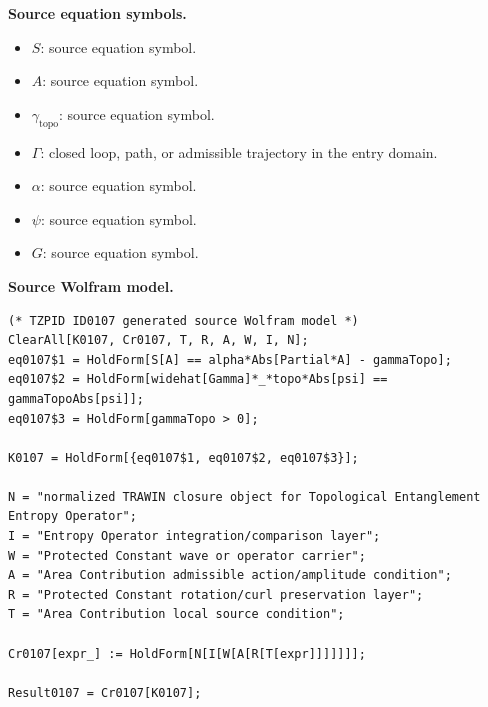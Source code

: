 \begin{minipage}[t]{0.49\linewidth}
\begingroup
\small
\raggedright
\textbf{Source equation symbols.}\par
\begin{itemize}[leftmargin=1.35em,itemsep=1pt,topsep=1pt,parsep=0pt]
    \item $S$: source equation symbol.
    \item $A$: source equation symbol.
    \item $\gamma_{\mathrm{topo}}$: source equation symbol.
    \item $\Gamma$: closed loop, path, or admissible trajectory in the entry domain.
    \item $\alpha$: source equation symbol.
    \item $\psi$: source equation symbol.
    \item $G$: source equation symbol.
\end{itemize}
\endgroup
\end{minipage}\hfill
\begin{minipage}[t]{0.47\linewidth}
\begingroup
\scriptsize
\raggedright
\textbf{Source Wolfram model.}\par
\begin{Verbatim}[fontsize=\tiny,breaklines=true,breakanywhere=true]
(* TZPID ID0107 generated source Wolfram model *)
ClearAll[K0107, Cr0107, T, R, A, W, I, N];
eq0107$1 = HoldForm[S[A] == alpha*Abs[Partial*A] - gammaTopo];
eq0107$2 = HoldForm[widehat[Gamma]*_*topo*Abs[psi] == gammaTopoAbs[psi]];
eq0107$3 = HoldForm[gammaTopo > 0];

K0107 = HoldForm[{eq0107$1, eq0107$2, eq0107$3}];

N = "normalized TRAWIN closure object for Topological Entanglement Entropy Operator";
I = "Entropy Operator integration/comparison layer";
W = "Protected Constant wave or operator carrier";
A = "Area Contribution admissible action/amplitude condition";
R = "Protected Constant rotation/curl preservation layer";
T = "Area Contribution local source condition";

Cr0107[expr_] := HoldForm[N[I[W[A[R[T[expr]]]]]]];

Result0107 = Cr0107[K0107];
\end{Verbatim}
\endgroup
\end{minipage}

